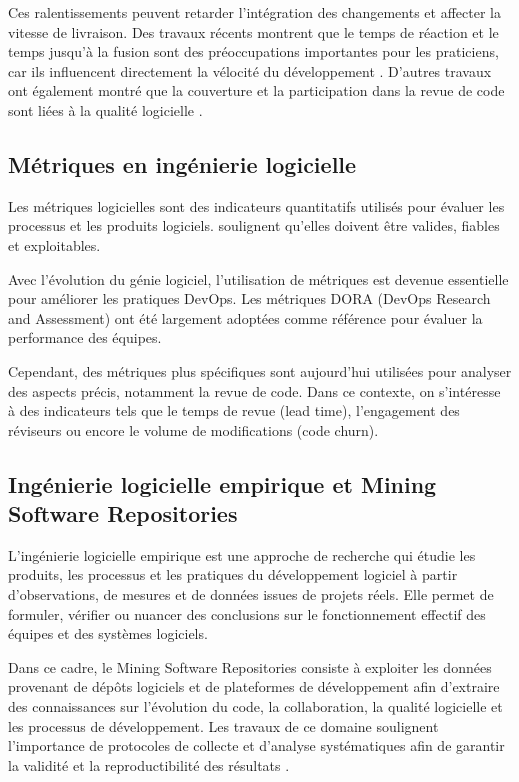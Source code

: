 Ces ralentissements peuvent retarder l’intégration des changements et affecter la vitesse de livraison. Des travaux récents montrent que le temps de réaction et le temps jusqu’à la fusion sont des préoccupations importantes pour les praticiens, car ils influencent directement la vélocité du développement \cite{kudrjavets2024speed}. D’autres travaux ont également montré que la couverture et la participation dans la revue de code sont liées à la qualité logicielle \cite{mcintosh2014impact}.





\subsection{Métriques en ingénierie logicielle}

Les métriques logicielles sont des indicateurs quantitatifs utilisés pour évaluer les processus et les produits logiciels.  \cite{fenton2014software} soulignent qu’elles doivent être valides, fiables et exploitables.

Avec l’évolution du génie logiciel, l’utilisation de métriques est devenue essentielle pour améliorer les pratiques DevOps. Les métriques DORA (DevOps Research and Assessment) ont été largement adoptées comme référence pour évaluer la performance des équipes.

Cependant, des métriques plus spécifiques sont aujourd’hui utilisées pour analyser des aspects précis, notamment la revue de code. Dans ce contexte, on s’intéresse à des indicateurs tels que le temps de revue (lead time), l’engagement des réviseurs ou encore le volume de modifications (code churn).

\subsection{Ingénierie logicielle empirique et Mining Software Repositories}

L’ingénierie logicielle empirique est une approche de recherche qui étudie les produits, les processus et les pratiques du développement logiciel à partir d’observations, de mesures et de données issues de projets réels. Elle permet de formuler, vérifier ou nuancer des conclusions sur le fonctionnement effectif des équipes et des systèmes logiciels.

Dans ce cadre, le Mining Software Repositories consiste à exploiter les données provenant de dépôts logiciels et de plateformes de développement afin d’extraire des connaissances sur l’évolution du code, la collaboration, la qualité logicielle et les processus de développement. Les travaux de ce domaine soulignent l’importance de protocoles de collecte et d’analyse systématiques afin de garantir la validité et la reproductibilité des résultats \cite{hassan2008road,vidoni2022systematic}.

